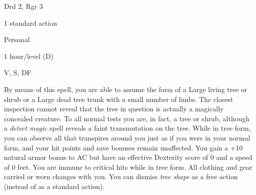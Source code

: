 
\begin{description*}
\item[Level:] Drd 2, Rgr 3
\item[Casting Time:] 1 standard action
\item[Range:] Personal
\item[Duration:] 1 hour/level (D)
\item[Components:] V, S, DF
\end{description*}

By means of this spell, you are able to assume the form of a Large living tree
or shrub or a Large dead tree trunk with a small number of limbs. The closest inspection
cannot reveal that the tree in question is actually a magically concealed creature.
To all normal tests you are, in fact, a tree or shrub, although a \textit{detect
magic} spell reveals a faint transmutation on the tree. While in tree form, you
can observe all that transpires around you just as if you were in your normal form,
and your hit points and save bonuses remain unaffected. You gain a +10 natural
armor bonus to AC but have an effective Dexterity score of 0 and a speed of 0 feet.
You are immune to critical hits while in tree form. All clothing and gear carried
or worn changes with you.
You can dismiss \textit{tree shape} as a free action (instead of as a standard
action).